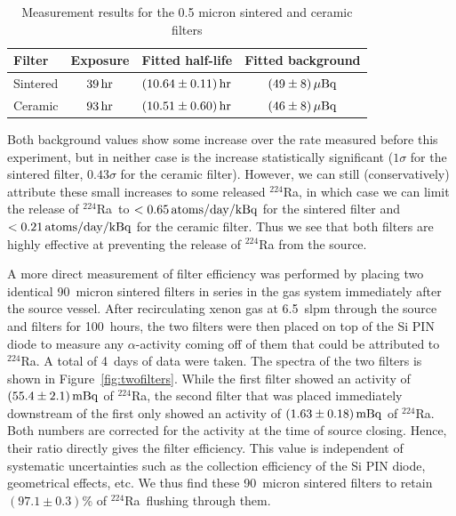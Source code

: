 \begin{table}[htb]
\centering
    \caption{Measurement results for the 0.5 micron sintered and ceramic filters}
    \label{tab:filter_limits}
    \renewcommand{\arraystretch}{1.2}
    \begin{tabular}{|lccc|}
        \hline\hline
        Filter & Exposure & Fitted half-life & Fitted background \\ \hline
        Sintered & $39\,\mathrm{hr}$ & $(10.64\pm0.11)\,\mathrm{hr}$ & $(49\pm8)\,\mathrm{\mu Bq}$\\
        Ceramic & $93\,\mathrm{hr}$ & $(10.51\pm0.60)\,\mathrm{hr}$ & $(46\pm8)\,\mathrm{\mu Bq}$\\
        \hline\hline
    \end{tabular}
\end{table}

Both background values show some increase over the rate measured before this experiment, but in neither case is the increase statistically significant ($1\sigma$ for the sintered filter, $0.43\sigma$ for the ceramic filter). However, we can still (conservatively) attribute these small increases to some released $^{224}$Ra, in which case we can limit the release of $^{224}$Ra~to $<0.65\,\mathrm{atoms/day/kBq}$ for the sintered filter and $<0.21\,\mathrm{atoms/day/kBq}$ for the ceramic filter. Thus we see that both filters are highly effective at preventing the release of $^{224}$Ra from the source.

A more direct measurement of filter efficiency was performed by placing two identical 90~micron sintered filters in series in the gas system immediately after the source vessel. After recirculating xenon gas at 6.5~slpm through the source and filters for 100~hours, the two filters were then placed on top of the Si PIN diode to measure any $\alpha$-activity coming off of them that could be attributed to $^{224}$Ra. A total of 4~days of data were taken. The spectra of the two filters is shown in Figure~\ref{fig:twofilters}. While the first filter showed an activity of $(55.4\pm2.1)\,\mathrm{mBq}$ of $^{224}$Ra, the second filter that was placed immediately downstream of the first only showed an activity of $(1.63\pm0.18)\,\mathrm{mBq}$ of $^{224}$Ra. Both numbers are corrected for the activity at the time of source closing. Hence, their ratio directly gives the filter efficiency. This value is independent of systematic uncertainties such as the collection efficiency of the Si PIN diode, geometrical effects, etc. We thus find these 90~micron sintered filters to retain $(97.1\pm0.3)$\% of $^{224}$Ra~flushing through them.

